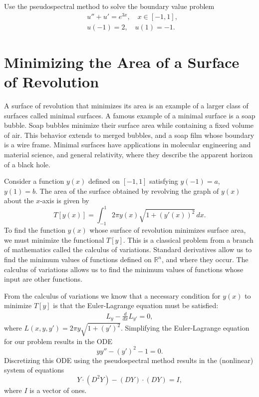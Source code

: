 \begin{problem}
Use the pseudospectral method to solve the boundary value problem 
\begin{align*}
&{ } u'' + u' = e^{3x}, \quad x \in [-1,1], \\
&{ } u(-1) = 2, \quad u(1) = -1.
\end{align*}
	
\end{problem}





\section*{Minimizing the Area of a Surface of Revolution}
A surface of revolution that minimizes its area is an example of a larger class of surfaces called minimal surfaces. A famous example of a minimal surface is a soap bubble. Soap bubbles minimize their surface area while containing a fixed volume of air. This behavior extends to merged bubbles, and a soap film whose boundary is a wire frame. Minimal surfaces have applications in molecular engineering and material science, and general relativity, where they describe the apparent horizon of a black hole. 

Consider a function $y(x)$ defined on $[-1,1]$ satisfying $y(-1) = a $, $y(1) = b. $ The area of the surface obtained by revolving the graph of $y(x)$ about the $x$-axis is given by 
\[T[y(x)] = \int_{-1}^1 2 \pi y(x) \sqrt{1 + (y'(x))^2}\, dx .\]
To find the function $y(x)$ whose surface of revolution minimizes surface area, we must minimize the functional $T[y]$. 
This is a classical problem from a branch of mathematics called the calculus of variations. 
Standard derivatives allow us to find the minimum values of functions defined on $\mathbb{R}^n$, and where they occur. 
The calculus of variations allows us to find the minimum values of functions whose input are other functions. 

From the calculus of variations we know that a necessary condition for $y(x)$ to minimize $T[y]$ is that the Euler-Lagrange equation must be satisfied: 
\begin{align*}
	L_y - \frac{d}{dx}L_{y'} = 0,
\end{align*}
where $L(x,y,y') = 2 \pi y \sqrt{1 + (y')^2}$.  
Simplifying the Euler-Lagrange equation for our problem results in the ODE
\[y y'' - (y')^2 -1 = 0.\]
Discretizing this ODE using the pseudospectral method results in the (nonlinear) system of equations 
\[
Y \cdot (D^2 Y) - (DY) \cdot (DY) = I,
\]
where $I$ is a vector of ones.

